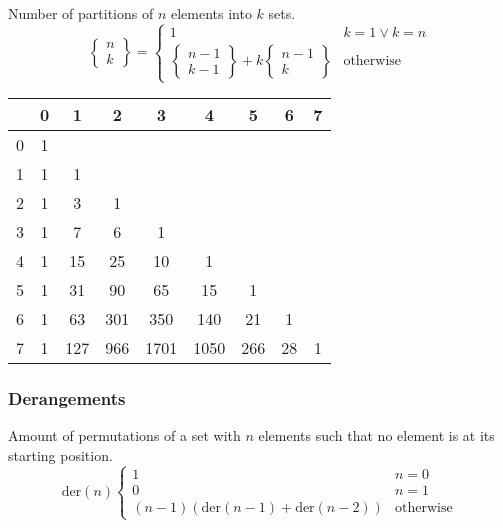 Number of partitions of $n$ elements into $k$ sets.
\begin{equation*}
  \begin{Bmatrix}
    n\\k
  \end{Bmatrix} =
  \begin{cases}
    1 & k = 1 \lor k = n\\
    \left\{
      \begin{smallmatrix}
        n - 1\\k - 1
      \end{smallmatrix}
\right\} + k \left\{
  \begin{smallmatrix}
    n - 1\\k
  \end{smallmatrix}
\right\} & \text{otherwise}
  \end{cases}
\end{equation*}
\begin{center}
	\begin{tabular}{ |l||c|c|c|c|c|c|c|c| } 
		\hline
		\diagbox{$n$}{$k$} & 0 & 1 & 2 & 3 & 4 & 5 & 6 & 7  \\
		\hline\hline
		0 &  1 &     &     &      &      &     &     &  \\
		1 &  1 & 1   &     &      &      &     &     &  \\
		2 &  1 & 3   & 1   &      &      &     &     &  \\
		3 &  1 & 7   & 6   & 1    &      &     &     &  \\
		4 &  1 & 15  & 25  & 10   & 1    &     &     &  \\
		5 &  1 & 31  & 90  & 65   & 15   & 1   &     &  \\
		6 &  1 & 63  & 301 & 350  & 140  & 21  & 1   &  \\
		7 &  1 & 127 & 966 & 1701 & 1050 & 266 & 28 & 1 \\
		\hline
	\end{tabular}
\end{center}

\subsubsection{Derangements}
Amount of permutations of a set with $n$ elements such that no element
is at its starting position.
\begin{equation*}
  \text{der}(n)
  \begin{cases}
    1 & n = 0\\
    0 & n = 1\\
    (n - 1)(\text{der}(n - 1) + \text{der}(n - 2)) & \text{otherwise}
  \end{cases}
\end{equation*}

